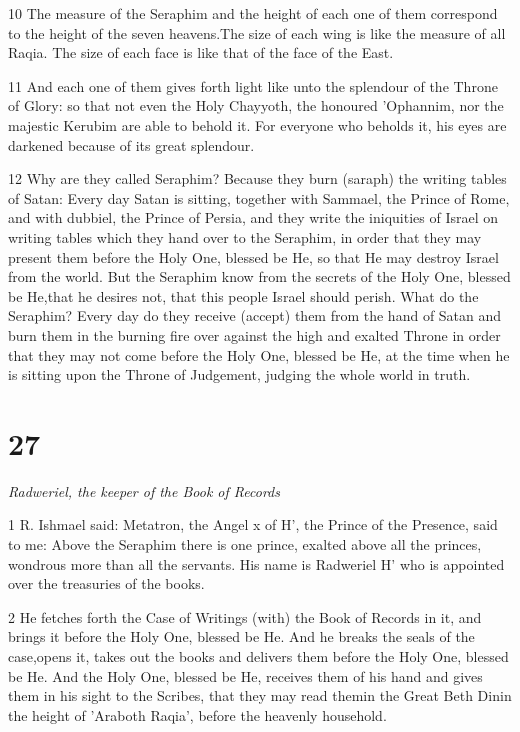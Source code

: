 \par 10 The measure of the Seraphim and the height of each one of them correspond to the height of the seven heavens.The size of each wing is like the measure of all Raqia. The size of each face is like that of the face of the East. 

\par 11 And each one of them gives forth light like unto the splendour of the Throne of Glory: so that not even the Holy Chayyoth, the honoured 'Ophannim, nor the majestic Kerubim are able to behold it. For everyone who beholds it, his eyes are darkened because of its great splendour. 

\par 12 Why are they called Seraphim? Because they burn (saraph) the writing tables of Satan: Every day Satan is sitting, together with Sammael, the Prince of Rome, and with dubbiel, the Prince of Persia, and they write the iniquities of Israel on writing tables which they hand over to the Seraphim, in order that they may present them before the Holy One, blessed be He, so that He may destroy Israel from the world. But the Seraphim know from the secrets of the Holy One, blessed be He,that he desires not, that this people Israel should perish. What do the Seraphim? Every day do they receive (accept) them from the hand of Satan and burn them in the burning fire over against the high and exalted Throne in order that they may not come before the Holy One, blessed be He, at the time when he is sitting upon the Throne of Judgement, judging the whole world in truth. 



\chapter{27}

\par \textit{Radweriel, the keeper of the Book of Records}

\par 1 R. Ishmael said: Metatron, the Angel x of H', the Prince of the Presence, said to me: Above the Seraphim there is one prince, exalted above all the princes, wondrous more than all the servants. His name is Radweriel H' who is appointed over the treasuries of the books. 

\par 2 He fetches forth the Case of Writings (with) the Book of Records in it, and brings it before the Holy One, blessed be He. And he breaks the seals of the case,opens it, takes out the books and delivers them before the Holy One, blessed be He. And the Holy One, blessed be He, receives them of his hand and gives them in his sight to the Scribes, that they may read themin the Great Beth Dinin the height of 'Araboth Raqia', before the heavenly household. 

